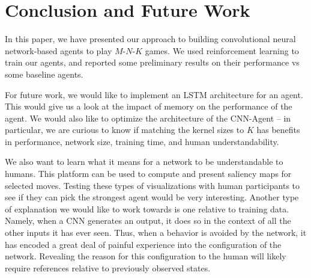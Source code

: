 \section{Conclusion and Future Work}

In this paper, we have presented our approach to building convolutional neural network-based agents to play $M$-$N$-$K$ games.
We used reinforcement learning to train our agents, and reported some preliminary results on their performance vs some baseline agents.

For future work, we would like to implement an LSTM architecture for an agent.
This would give us a look at the impact of memory on the performance of the agent.
We would also like to optimize the architecture of the CNN-Agent -- in particular, we are curious to know if matching the kernel sizes to $K$ has benefits in performance, network size, training time, and human understandability.

We also want to learn what it means for a network to be understandable to humans.
This platform can be used to compute and present saliency maps for selected moves.
Testing these types of visualizations with human participants to see if they can pick the strongest agent would be very interesting.
Another type of explanation we would like to work towards is one relative to training data. 
Namely, when a CNN generates an output, it does so in the context of all the other inputs it has ever seen.
Thus, when a behavior is avoided by the network, it has encoded a great deal of painful experience into the configuration of the network.
Revealing the reason for this configuration to the human will likely require references relative to previously observed states.
